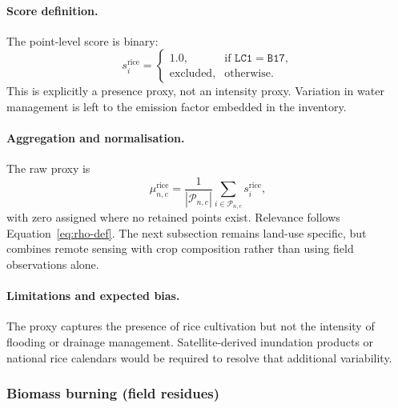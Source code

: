 \paragraph{Score definition.}
The point-level score is binary:
\begin{equation}
  s_i^{\mathrm{rice}} =
  \begin{cases}
    1.0, & \text{if } \texttt{LC1}=\texttt{B17},\\
    \text{excluded}, & \text{otherwise}.
  \end{cases}
\end{equation}
This is explicitly a presence proxy, not an intensity proxy. Variation
in water management is left to the emission factor embedded in the
inventory.

\paragraph{Aggregation and normalisation.}
The raw proxy is
\begin{equation}
  \mu_{n,c}^{\mathrm{rice}} =
  \frac{1}{|\mathcal{P}_{n,c}|}
  \sum_{i \in \mathcal{P}_{n,c}} s_i^{\mathrm{rice}},
\end{equation}
with zero assigned where no retained points exist. Relevance follows
Equation~\ref{eq:rho-def}. The next subsection remains land-use
specific, but combines remote sensing with crop composition rather than
using field observations alone.

\paragraph{Limitations and expected bias.}
The proxy captures the presence of rice cultivation but not the
intensity of flooding or drainage management. Satellite-derived
inundation products or national rice calendars would be required to
resolve that additional variability.

\subsubsection{Biomass burning (field residues)}
\label{sec:proxy-biomass}

